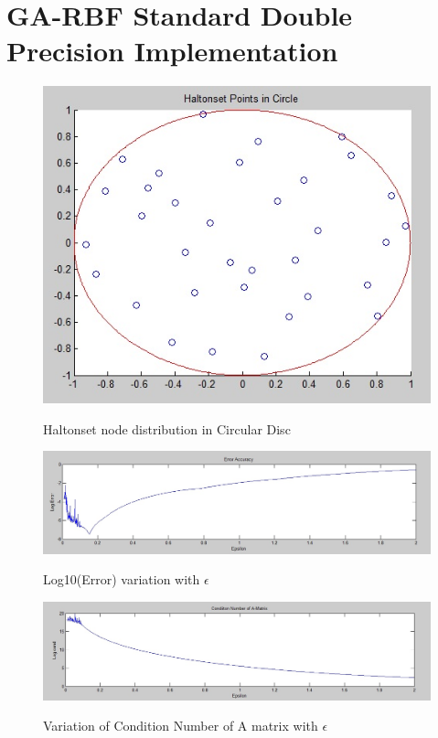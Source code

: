 \documentclass[11pt]{article}
\begin{document}


\section{GA-RBF Standard Double Precision Implementation}


\begin{figure}[h!]
\centering
\includegraphics[scale=0.4]{hw3_halton.jpg}\\
\caption{Haltonset node distribution in Circular Disc}
\label{fig:haltonSet}
\end{figure}



\begin{figure}[h!]
\centering
\includegraphics[scale=0.5]{hw3_error.jpg}\\
\caption{Log10(Error) variation with $\epsilon$}
\label{fig:logError}
\end{figure}



\begin{figure}[h!]
\centering
\includegraphics[scale=0.5]{hw3_cond.jpg}\\
\caption{Variation of Condition Number of A matrix with $\epsilon$}
\label{fig:condNumber}
\end{figure}
\end{document}
